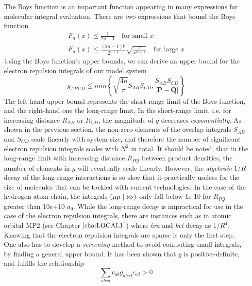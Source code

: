 \noindent The Boys function is an important function appearing in many expressions for molecular integral evaluation. There are two expressions that bound the Boys function
\begin{equation}
\begin{split}
F_n(x) \leq \frac{1}{2n+1} \quad \textrm{for small } x \\
F_n(x) \leq \frac{(2n-1)!!}{2^{n+1}}\sqrt{\frac{\pi}{x^{2n+1}}} \quad \textrm{for large } x 
\end{split}
\end{equation}
\noindent Using the Boys function's upper bounds, we can derive an upper bound for the electron repulsion integrals of our model system
\begin{equation}
g_{ABCD} \leq min \left\lbrace \sqrt{\frac{4\eta}{\pi}} S_{AB} S_{CD}, \frac{S_{AB} S_{CD}}{\left\lvert \mathbf{P} - \mathbf{Q} \right\rvert} \right\rbrace
\end{equation}
\noindent The left-hand upper bound represents the short-range limit of the Boys function, and the right-hand one the long-range limit. In the short-range limit, i.e. for increasing distance $R_{AB}$ or $R_{CD}$, the magnitude of $g$ decreases \emph{exponentially}. As shown in the previous section, the non-zero elements of the overlap integrals $S_{AB}$ and $S_{CD}$ scale linearly with system size, and therefore the number of significant electron repulsion integrals scales with $N^2$ in total. 
It should be noted, that in the long-range limit with increasing distance $R_{PQ}$ between product densities, the number of elements in $g$ will eventually scale linearly. However, the \emph{algebraic} $1/R$ decay of the long-range interactions is so slow that it practically useless for the size of molecules that can be tackled with current technologies. In the case of the hydrogen atom chain, the integrals $\left( \mu\mu \mid \nu\nu \right)$ only fall below 1e-10 for $R_{PQ}$ greater than 10e+10 $a_0$. While the long-range decay is impractical for use in the case of the electron repulsion integrals, there are instances such as in atomic orbital MP2 (see Chapter $\ref{cha:LOCAL1}$) where \emph{bra} and \emph{ket} decay as $1/R^4$.
Knowing that the electron repulsion integrals are sparse is only the first step. One also has to develop a \emph{screening} method to avoid computing small integrals, by finding a general upper bound. It has been shown \cite{Roo1951} that $g$ is positive-definite, and fulfills the relationship
\begin{equation}
\sum_{abcd} c_{ab} g_{abcd} c_{cd} > 0
\end{equation}
